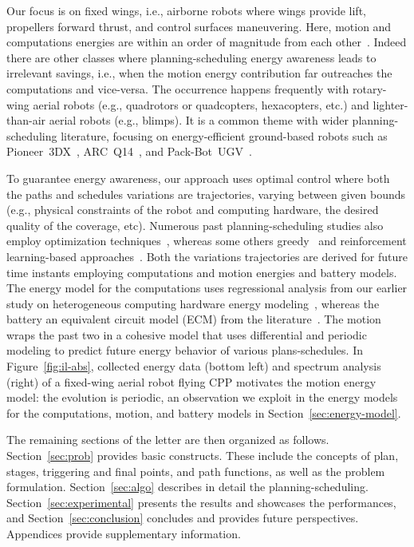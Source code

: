 \documentclass[letterpaper,10pt,journal,twoside]{IEEEtran}
\theoremstyle{definition}
\begin{document}
Our focus is on fixed wings, i.e., airborne robots where wings provide lift, propellers forward thrust, and control surfaces maneuvering. Here, motion and computations energies are within an order of magnitude from each other~\cite{seewald2020mechanical}. Indeed there are other classes where planning-scheduling energy awareness leads to irrelevant savings, i.e., when the motion energy contribution far outreaches the computations and vice-versa. The occurrence happens frequently with rotary-wing aerial robots (e.g., quadrotors or quadcopters, hexacopters, etc.) and lighter-than-air aerial robots (e.g., blimps). It is a common theme with wider planning-scheduling literature, focusing on energy-efficient ground-based robots such as Pioneer~3DX~\cite{ho2018towards,ho2019learning,ho2019qos,mei2005case}, ARC~Q14~\cite{ondruska2015scheduled,lahijanian2018resource}, and Pack-Bot~UGV~\cite{sadrpour2013mission}.

To guarantee energy awareness, our approach uses optimal control where both the paths and schedules variations are trajectories, varying between given bounds (e.g., physical constraints of the robot and computing hardware, the desired quality of the coverage, etc). Numerous past planning-scheduling studies also employ optimization techniques~\cite{brateman2006energy,zhang2007low,ondruska2015scheduled,lahijanian2018resource}, whereas some others greedy~\cite{mei2005case,sudhakar2020balancing,sadrpour2013mission} and reinforcement learning-based approaches~\cite{ho2019qos,ho2018towards,ho2019learning}. Both the variations trajectories are derived for future time instants employing computations and motion energies and battery models. The energy model for the computations uses regressional analysis from our earlier study on heterogeneous computing hardware energy modeling~\cite{seewald2019coarse,seewald2019component}, whereas the battery an equivalent circuit model (ECM) from the literature~\cite{he2011evaluation,hinz2019comparison,mousavi2014various}. The motion wraps the past two in a cohesive model that uses differential and periodic modeling to predict future energy behavior of various plans-schedules. In Figure~\ref{fig:il-abs}, collected energy data (bottom left) and spectrum analysis (right) of a fixed-wing aerial robot flying CPP motivates the motion energy model: the evolution is periodic, an observation we exploit in the energy models for the computations, motion, and battery models in Section~\ref{sec:energy-model}.

The remaining sections of the letter are then organized as follows. Section~\ref{sec:prob} provides basic constructs. These include the concepts of %
plan, stages, triggering and final points, and path functions, as well as the problem formulation. Section~\ref{sec:algo} describes in detail the planning-scheduling. Section~\ref{sec:experimental} presents the results and showcases the performances, and Section~\ref{sec:conclusion} concludes and provides future perspectives. Appendices provide supplementary information.
\end{document}
